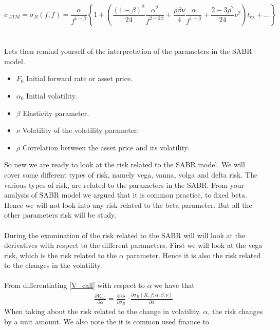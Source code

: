\begin{equation}
    \sigma_{ATM} = \sigma_B(f, f) = \frac{\alpha}{f^{1-\beta}} \left\{ 1 + \left( \frac{(1-\beta)^2}{24} \frac{\alpha^2}{f^{2-2\beta}} + \frac{\rho \beta \nu}{4} \frac{\alpha}{f^{1-\beta}} + \frac{2-3\rho^2}{24} \nu^2 \right) t_{\text{ex}} + \ldots \right\}
    \label{sigma_ff_risk}
\end{equation}
\\\\
Lets then remind yourself of the interpretation of the parameters in the SABR model. 
\begin{itemize}
    \item $F_0$ \text{---} Initial forward rate or asset price.
    \item $\alpha_0$ \text{---} Initial volatility.
    \item $\beta$ \text{---} Elasticity parameter.
    \item $\nu$ \text{---} Volatility of the volatility parameter.
    \item $\rho$ \text{---} Correlation between the asset price and its volatility.
\end{itemize}
\noindent
So new we are ready to look at the risk related to the SABR model.
We will cover some different types of risk, namely vega, vanna, volga and delta risk. 
The various types of risk, are related to the parameters in the SABR. 
From your analysis of SABR model we argued that it is common practice, 
to fixed beta. Hence we will not look into any risk related to the beta parameter. 
But all the other parameters risk will be study. 
\\\\
During the examination of the risk related to the SABR will will look at 
the derivatives with respect to the different parameters. 
First we will look at the vega risk, which is the risk related to the $\alpha$ parameter. 
Hence it is also the risk related to the changes in the  volatility.
\\\\
From differentiating \autoref{V_call} with respect to $\alpha$ we have that
\begin{align}
    \frac{\partial V_{\text{call}}}{\partial \alpha} = 
    \frac{\partial \text{BS}}{\partial \sigma_B} \cdot \frac{\partial 
    \sigma_B(K, f; \alpha, \beta, \nu)}{\partial \alpha}
\end{align}
When taking about the risk related to the change in volatility, $\alpha$, 
the risk changes by a unit amount. We also note the it is common used finance to 
